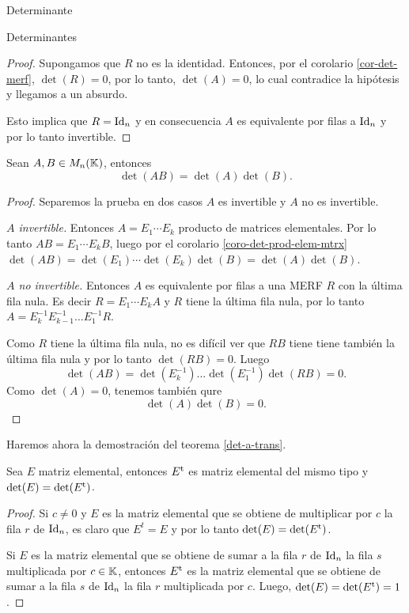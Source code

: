 \begin{chapter}{Determinante}
\begin{section}{Determinantes}
\begin{proof}
      Supongamos que $R$ no es la identidad.  Entonces, por el corolario \ref{cor-det-merf}, $\det(R) =0$,  por lo tanto, $\det(A)=0$, lo cual contradice la hipótesis y llegamos a un absurdo.

      Esto implica que  $R= \operatorname{Id}_n$ y en consecuencia  $A$ es equivalente por filas a $\operatorname{Id}_n$ y por lo tanto  invertible.
  \end{proof}

  \begin{teorema}\label{th-dem-detAB}  Sean $A,B \in M_n(\mathbb K)$,  entonces
      $$\det (A B) = \det(A)\det(B).$$
  \end{teorema}
  \begin{proof} Separemos la prueba en dos casos  $A$ es invertible  y  $A$ no es invertible.

      \textit{$A$ invertible.} Entonces $A= E_1\cdots E_k$ producto de matrices elementales. Por lo tanto  $AB =  E_1\cdots E_kB$, luego por el corolario \ref{coro-det-prod-elem-mtrx}  $\det(AB) =  \det(E_1)\cdots \det(E_k)\det(B) = \det(A)\det(B)$.

      \textit{$A$ no invertible.}  Entonces $A$  es equivalente por filas a una MERF $R$ con la última fila nula. Es decir $R =E_1\cdots E_kA$ y $R$ tiene la última fila nula, por  lo tanto $A=  E_k^{-1}E_{k-1}^{-1}\ldots E_1^{-1}R$.

      Como $R$ tiene la última fila nula, no es difícil ver que  $RB$ tiene tiene también la última fila nula y por lo tanto $\det(RB)=0$. Luego
      $$
          \det(AB) = \det( E_k^{-1}) \ldots \det(E_1^{-1})\det(RB) =0.
      $$
      Como  $\det(A)=0$, tenemos también qure
      $$
          \det(A)\det(B) =0.
      $$
  \end{proof}

  Haremos ahora la demostración del teorema \ref{det-a-trans}.

  \begin{teorema}
      Sea $E$ matriz elemental, entonces $E^{\operatorname{t}}$ es matriz elemental del mismo tipo y $\det(E) = \det(E^{\operatorname{t}})$.
  \end{teorema}
  \begin{proof}
      Si $c \not=0$ y $E$ es la matriz elemental que se obtiene de multiplicar por  $c$ la fila $r$ de $\operatorname{Id}_n$, es claro que $E^t = E$ y por lo tanto 	$\det(E) = \det(E^{\operatorname{t}})$.

      Si $E$ es la matriz elemental que se obtiene de sumar a la fila $r$ de $\operatorname{Id}_n$ la fila $s$ multiplicada por $c \in \mathbb K$,  entonces  $E^{\operatorname{t}}$  es la matriz elemental que se obtiene de sumar a la fila $s$ de $\operatorname{Id}_n$ la fila $r$ multiplicada por $c$. Luego,   $\det(E) = \det(E^{\operatorname{t}}) = 1$.


\end{proof}
\end{section}
\end{chapter}
